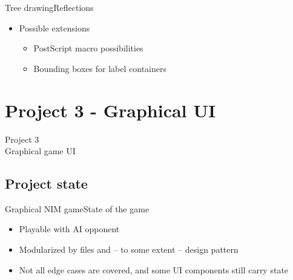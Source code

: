 \documentclass{beamer}
\begin{document}
\begin{frame}{Tree drawing}{Reflections}
  \begin{itemize}
  \item {
    Possible extensions
  }
  \begin{itemize}
    \item PostScript macro possibilities
    \item Bounding boxes for label containers
    \end{itemize}
  \end{itemize}
\end{frame}
\section{Project 3 - Graphical UI}
\begin{frame}[plain,c]
\begin{center}
\Huge Project 3\\
\vspace{5mm}
\Large Graphical game UI
\end{center}
\end{frame}


\subsection{Project state}
\begin{frame}{Graphical NIM game}{State of the game}
  \begin{itemize}
  \item {
    Playable with AI opponent
  }
  \item {
    Modularized by files and -- to some extent -- design pattern
  }
  \item {
    Not all edge cases are covered, and some UI components still carry state
  }
  \end{itemize}
\end{frame}
\end{document}
